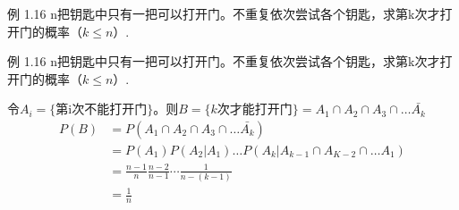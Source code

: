 \documentclass{beamer}
\begin{document}
	\begin{frame}
		例 1.16 n把钥匙中只有一把可以打开门。不重复依次尝试各个钥匙，求第k次才打开门的概率（$k \leq n$）.
		
	\end{frame}
	
	\begin{frame}
		例 1.16 n把钥匙中只有一把可以打开门。不重复依次尝试各个钥匙，求第k次才打开门的概率（$k \leq n$）.
		
		令$A_i = \{\text{第i次不能打开门}\}$。则$B = \{k\text{次才能打开门}\} = A_1 \cap A_2 \cap A_3 \cap \dots \bar{A_k}$
		\begin{align}
			P(B) & = P(A_1 \cap A_2 \cap A_3 \cap \dots \bar{A_k}) \\
			& = P(A_1) P(A_2 | A_1) \dots P(A_k | A_{k - 1} \cap A_{K - 2} \cap \dots A_1) \\
			& = \frac{n - 1}{n} \frac{n - 2}{n - 1} \cdots \frac{1}{n - (k - 1)} \\
			& = \frac{1}{n}
		\end{align}
	\end{frame}
	
\end{document}
